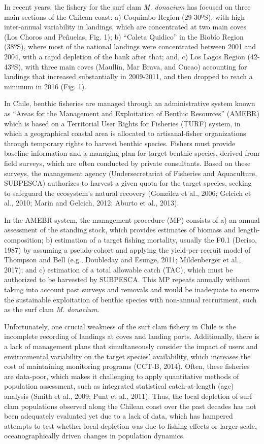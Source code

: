 \documentclass[12pt]{article}
\begin{document}
In recent years, the fishery for the surf clam \emph{M. donacium} has
focused on three main sections of the Chilean coast: a) Coquimbo Region
(29-30ºS), with high inter-annual variability in landings, which are
concentrated at two main coves (Los Choros and Peñuelas, Fig. 1); b)
``Caleta Quidico'' in the Biobío Region (38ºS), where most of the
national landings were concentrated between 2001 and 2004, with a rapid
depletion of the bank after that; and, c) Los Lagos Region (42-43ºS),
with three main coves (Maullín, Mar Brava, and Cucao) accounting for
landings that increased substantially in 2009-2011, and then dropped to
reach a minimum in 2016 (Fig. 1).

In Chile, benthic fisheries are managed through an administrative system
known as ``Areas for the Management and Exploitation of Benthic
Resources'' (AMEBR) which is based on a Territorial User Rights for
Fisheries (TURF) system, in which a geographical coastal area is
allocated to artisanal-fisher organizations through temporary rights to
harvest benthic species. Fishers must provide baseline information and a
managing plan for target benthic species, derived from field surveys,
which are often conducted by private consultants. Based on these
surveys, the management agency (Undersecretariat of Fisheries and
Aquaculture, SUBPESCA) authorizes to harvest a given quota for the
target species, seeking to safeguard the ecosystem's natural recovery
(González et al., 2006; Gelcich et al., 2010; Marín and Gelcich, 2012;
Aburto et al., 2013).

In the AMEBR system, the management procedure (MP) consists of a) an
annual assessment of the standing stock, which provides estimates of
biomass and length-composition; b) estimation of a target fishing
mortality, usually the F0.1 (Deriso, 1987) by assuming a pseudo-cohort
and applying the yield-per-recruit model of Thompson and Bell (e.g.,
Doubleday and Esunge, 2011; Mildenberger et al., 2017); and c)
estimation of a total allowable catch (TAC), which must be authorized to
be harvested by SUBPESCA. This MP repeats annually without taking into
account past surveys and removals and would be inadequate to ensure the
sustainable exploitation of benthic species with non-annual recruitment,
such as the surf clam \emph{M. donacium}.

Unfortunately, one crucial weakness of the surf clam fishery in Chile is
the incomplete recording of landings at coves and landing ports.
Additionally, there is a lack of management plans that simultaneously
consider the impact of users and environmental variability on the target
species' availability, which increases the cost of maintaining
monitoring programs (CCT-B, 2014). Often, these fisheries are data-poor,
which makes it challenging to apply quantitative methods of population
assessment, such as integrated statistical catch-at-length (age)
analysis (Smith et al., 2009; Punt et al., 2011). Thus, the local
depletion of surf clam populations observed along the Chilean coast over
the past decades has not been adequately evaluated yet due to a lack of
data, which has hampered attempts to test whether local depletion was
due to fishing effects or larger-scale, oceanographically driven changes
in population dynamics.
\end{document}
